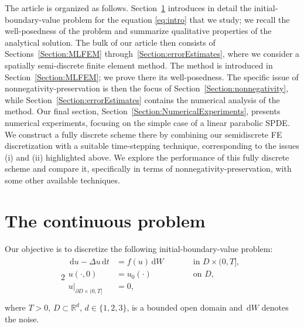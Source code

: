 \documentclass[12pt]{article}
\newcommand{\dd}{\,\mathrm{d}}
\begin{document}
The article is organized as follows. Section~\ref{Sect:continousProblem} introduces in detail the initial-boundary-value problem for the equation \eqref{eq:intro} that we study; we recall the well-posedness of the problem and summarize qualitative properties of the analytical solution. The bulk of our article then consists of Sections~\ref{Section:MLFEM} through~\ref{Section:errorEstimates}, where we consider a spatially semi-discrete  finite element method. The method is introduced in Section~\ref{Section:MLFEM}; we prove there its well-posedness. The specific issue of nonnegativity-preservation is then the focus of Section~\ref{Section:nonnegativity}, while Section~\ref{Section:errorEstimates} contains the numerical analysis of the method. Our final section,  Section~\ref{Section:NumericalExperiments}, presents numerical experiments, focusing on the simple case of a linear parabolic SPDE. We construct a fully discrete scheme there by combining our semidiscrete FE discretization with a suitable time-stepping technique, corresponding to the issues (i) and (ii) highlighted above. We explore the performance of this fully discrete scheme and compare it, specifically in terms of nonnegativity-preservation, with some other available techniques.
 
\section{The continuous problem}\label{Sect:continousProblem}

Our objective is to discretize the following initial-boundary-value problem: 
\begin{alignat}{2}
\begin{aligned}\label{eq:contSPDE}
    \dd u - \Delta u \dd t 
     &= f(u) \dd W &&\qquad \text{in } D \times (0,T], \\
    u(\cdot,0) &= u_0(\cdot) &&\qquad \text{on } D, \\
    u |_{\partial D \times (0,T]} &= 0, \\
\end{aligned}
\end{alignat}
%
where $T>0$, $D \subset \mathbb{R}^d$, $d \in \{1,2,3\}$, is a bounded open domain and $\dd W$ denotes the noise.
\end{document}
